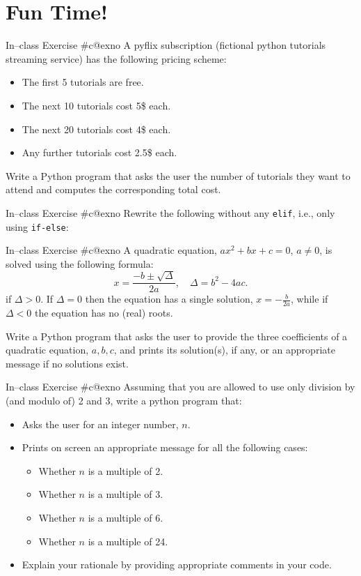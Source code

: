 \documentclass[aspectratio=169, 12pt, xcolor=table]{beamer}
\makeatletter
\newcommand{\arabicthree}[1]{\expandafter\@arabicthree\csname c@#1\endcsname}
\newcommand{\@arabicthree}[1]{\ifnum #1<100 0\fi\ifnum #1<10 0\fi\number#1}
\newcounter{exno}
\newcommand{\exno}{\stepcounter{exno}In--class Exercise \#\arabicthree{exno}}
\makeatother
\begin{document}
	\section{Fun Time!}\label{sec:fun-time}
	
	\sectionframe
	
	\begin{frame}{\exno}
		A pyflix subscription (fictional python tutorials streaming service) has the following pricing scheme:
		\begin{itemize}
			\item The first 5 tutorials are free.
			\item The next 10 tutorials cost 5\$ each.
			\item The next 20 tutorials cost 4\$ each.
			\item Any further tutorials cost 2.5\$ each.
		\end{itemize}
		Write a Python program that asks the user the number of tutorials they want to attend and computes the corresponding total cost.
	\end{frame}

	\begin{frame}{\exno}
		Rewrite the following without any \texttt{elif}, i.e., only using \texttt{if-else}:
		
	\end{frame}

	\begin{frame}{\exno}
		A quadratic equation, $ax^2+bx+c=0$, $a\neq0$, is solved using the following formula:
		\[x=\frac{-b\pm\sqrt{\Delta}}{2a},\quad \Delta=b^2-4ac.\]
		if $\Delta>0$. If $\Delta=0$ then the equation has a single solution, $x=-\frac{b}{2a}$, while if $\Delta<0$ the equation has no (real) roots.
		
		Write a Python program that asks the user to provide the three coefficients of a quadratic equation, $a,b,c$, and prints its solution(s), if any, or an appropriate message if no solutions exist.
	\end{frame}

	\begin{frame}{\exno}
		Assuming that you are allowed to use only division by (and modulo of) 2 and 3, write a python program that:
		\begin{itemize}
			\item Asks the user for an integer number, $n$.
			\item Prints on screen an appropriate message for all the following cases:
			\begin{itemize}
				\item Whether $n$ is a multiple of 2.
				\item Whether $n$ is a multiple of 3.
				\item Whether $n$ is a multiple of 6.
				\item Whether $n$ is a multiple of 24.
			\end{itemize}
			\item Explain your rationale by providing appropriate comments in your code.
		\end{itemize}
	\end{frame}
\end{document}
